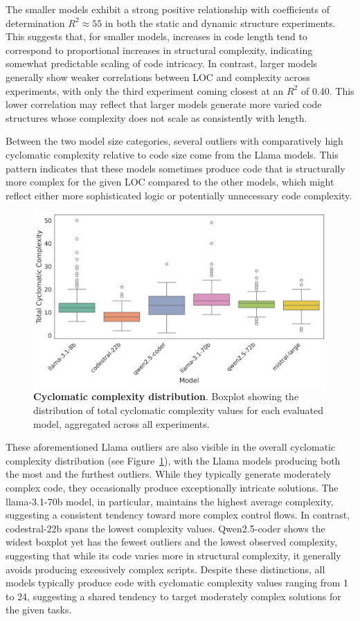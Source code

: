 \documentclass{DESSThesis}
\begin{document}
The smaller models exhibit a strong positive relationship with coefficients of determination $R^2\approx55$ in both the static and dynamic structure experiments. This suggests that, for smaller models, increases in code length tend to correspond to proportional increases in structural complexity, indicating somewhat predictable scaling of code intricacy. In contrast, larger models generally show weaker correlations between LOC and complexity across experiments, with only the third experiment coming closest at an $R^2$ of 0.40. This lower correlation may reflect that larger models generate more varied code structures whose complexity does not scale as consistently with length.

Between the two model size categories, several outliers with comparatively high cyclomatic complexity relative to code size come from the Llama models. This pattern indicates that these models sometimes produce code that is structurally more complex for the given LOC compared to the other models, which might reflect either more sophisticated logic or potentially unnecessary code complexity. 

\begin{figure}[ht]
    \centering
    \includegraphics[width=0.65\linewidth]{img/Results/First Experimental Phase/Cyclomatic Complexity Distribution per Model.png}
    \caption[Cyclomatic complexity distribution]{\textbf{Cyclomatic complexity distribution}. Boxplot showing the distribution of total cyclomatic complexity values for each evaluated model, aggregated across all experiments.}
    \label{fig:cyc_complexity}
\end{figure}

These aforementioned Llama outliers are also visible in the overall cyclomatic complexity distribution (see Figure~\ref{fig:cyc_complexity}), with the Llama models producing both the most and the furthest outliers. While they typically generate moderately complex code, they occasionally produce exceptionally intricate solutions. The llama-3.1-70b model, in particular, maintains the highest average complexity, suggesting a consistent tendency toward more complex control flows. In contrast, codestral-22b spans the lowest complexity values. Qwen2.5-coder shows the widest boxplot yet has the fewest outliers and the lowest observed complexity, suggesting that while its code varies more in structural complexity, it generally avoids producing excessively complex scripts. Despite these distinctions, all models typically produce code with cyclomatic complexity values ranging from 1 to 24, suggesting a shared tendency to target moderately complex solutions for the given tasks.
\end{document}
